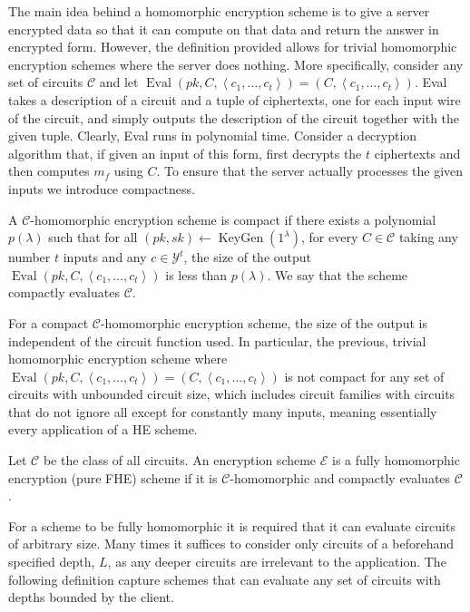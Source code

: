 The main idea behind a homomorphic encryption scheme is to give a server encrypted data so that it can compute on that data and return the answer in encrypted form. However, the definition provided allows for trivial homomorphic encryption schemes where the server does nothing. More specifically, consider any set of circuits $\mathcal{C}$ and let $\operatorname{Eval}(pk, C,\left\langle c_1, \dots ,c_t \right\rangle) = (C, \left\langle c_1, \dots, c_t \right \rangle)$. Eval takes a description of a circuit and a tuple of ciphertexts, one for each input wire of the circuit, and simply outputs the description of the circuit together with the given tuple. Clearly, Eval runs in polynomial time. Consider a decryption algorithm that, if given an input of this form, first decrypts the $t$ ciphertexts and then computes $m_f$ using $C$. To ensure that the server actually processes the given inputs we introduce compactness.

\begin{definition}[Compactness]
A $\mathcal{C}$-homomorphic encryption scheme is compact if there exists a polynomial $p(\lambda)$ such that for all $(pk,sk) \leftarrow \operatorname{KeyGen}(1^{\lambda})$, for every $C \in \mathcal{C}$ taking any number $t$ inputs and any $c \in \mathcal{Y}^t$, the size of the output $\operatorname{Eval}(pk, C, \left\langle c_1, \dots, c_t \right\rangle)$ is less than $p(\lambda)$. We say that the scheme compactly evaluates $\mathcal{C}$.
\end{definition}

For a compact $\mathcal{C}$-homomorphic encryption scheme, the size of the output is independent of the circuit function used. In particular, the previous, trivial homomorphic encryption scheme where $\operatorname{Eval}(pk, C,\left\langle c_1, \dots ,c_t \right\rangle) = (C, \left\langle c_1, \dots, c_t \right \rangle)$ is not compact for any set of circuits with unbounded circuit size, which includes circuit families with circuits that do not ignore all except for constantly many inputs, meaning essentially every application of a HE scheme.

\begin{definition}
Let $\mathcal{C}$ be the class of all circuits. An encryption scheme $\mathcal{E}$ is a fully homomorphic encryption (pure FHE) scheme if it is $\mathcal{C}$-homomorphic and compactly evaluates $\mathcal{C}$.
\end{definition}

For a scheme to be fully homomorphic it is required that it can evaluate circuits of arbitrary size. Many times it suffices to consider only circuits of a beforehand specified depth, $L$, as any deeper circuits are irrelevant to the application. The following definition capture schemes that can evaluate any set of circuits with depths bounded by the client.   

